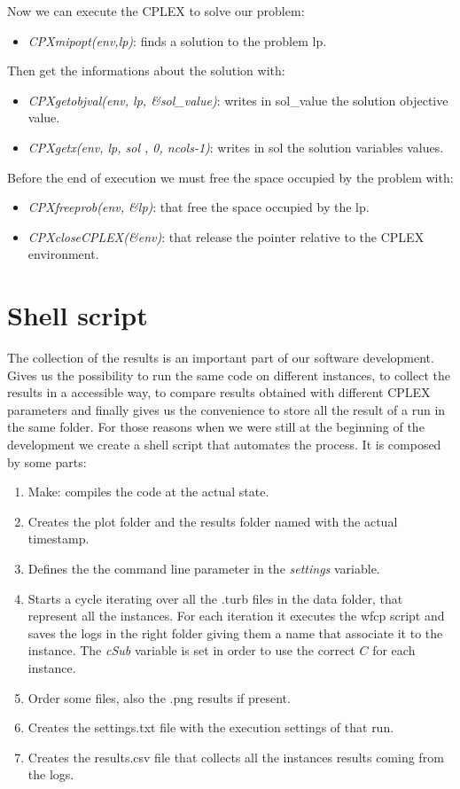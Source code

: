 \begin{appendices}
Now we can execute the \textsc{CPLEX} to solve our problem:
\begin{itemize}
\item \textit{CPXmipopt(env,lp)}: finds a solution to the problem lp.
\end{itemize}
Then get the informations about the solution with:
\begin{itemize}
\item \textit{CPXgetobjval(env, lp, \&sol\_value)}: writes in sol\_value the solution objective value.
\item \textit{CPXgetx(env, lp, sol , 0, ncols-1)}: writes in sol the solution variables values.
\end{itemize}

Before the end of execution we must free the space occupied by the problem with:
\begin{itemize}
\item \textit{CPXfreeprob(env, \&lp)}: that free the space occupied by the lp.
\item \textit{CPXcloseCPLEX(\&env)}: that release the pointer relative to the \textsc{CPLEX} environment.
\end{itemize}


\chapter{Shell script}
The collection of the results is an important part of our software development. Gives us the possibility to run the same code on different instances, to collect the results in a accessible way, to compare results obtained with different CPLEX parameters and finally gives us the convenience to store all the result of a run in the same folder. 
For those reasons when we were still at the beginning of the development we create a shell script that automates the process. It is composed by some parts:
\begin{enumerate}
\item Make: compiles the code at the actual state.
\item Creates the plot folder and the results folder named with the actual timestamp.
\item Defines the the command line parameter in the \textit{settings} variable.
\item Starts a cycle iterating over all the .turb files in the data folder, that represent all the instances. For each iteration it executes the wfcp script and saves the logs in the right folder giving them a name that associate it to the instance. The \textit{cSub} variable is set in order to use the correct $C$ for each instance.
\item Order some files, also the .png results if present.
\item Creates the settings.txt file with the execution settings of that run.
\item Creates the results.csv file that collects all the instances results coming from the logs.
\end{enumerate}


\end{appendices}
